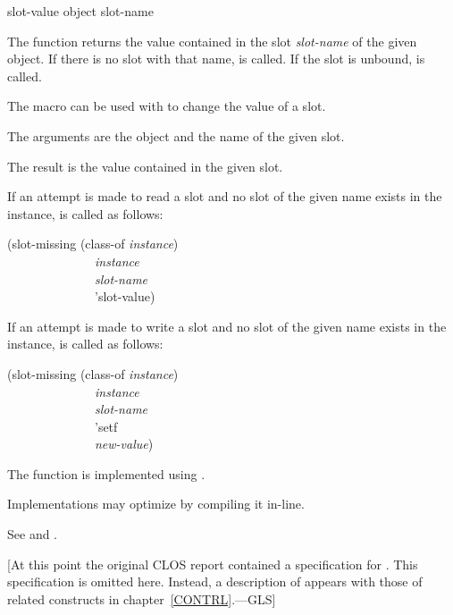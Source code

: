 \begin{defun}[Function]
slot-value object slot-name

The function  returns the value contained in the slot
{\it slot-name\/} of the given object.  If there is no slot with that
name,  is called.  If the slot is unbound,
 is called.

The macro  can be used with  to change the value
of a slot. 





The arguments are the object and the name of the given slot.


The result is the value contained in the given slot.


If an attempt is made to read a slot and no slot of the given name
exists in the instance,  is called as follows: 
\begin{lisp}
(slot-missing (class-of {\it instance\/}) \\
~~~~~~~~~~~~~~{\it instance} \\
~~~~~~~~~~~~~~{\it slot-name\/} \\
~~~~~~~~~~~~~~'slot-value)
\end{lisp}

If an attempt is made to write a slot and no slot of the given name
exists in the instance,  is called as follows: 
\begin{lisp}
(slot-missing (class-of {\it instance\/}) \\
~~~~~~~~~~~~~~{\it instance} \\
~~~~~~~~~~~~~~{\it slot-name\/} \\
~~~~~~~~~~~~~~'setf \\
~~~~~~~~~~~~~~{\it new-value\/})
\end{lisp}

The function  is implemented using 
.

Implementations may optimize  by compiling it in-line.

See  and .
\end{defun}


[At this point the original CLOS report \cite{SIGPLAN-CLOS,LASC-CLOS-PART-2}
contained a specification for .
This specification is omitted here.  Instead, a description
of  appears with those of related constructs in chapter~\ref{CONTRL}.---GLS]


